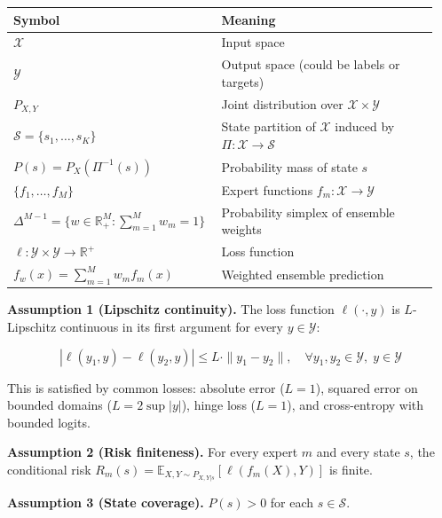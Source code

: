 \documentclass[
  12pt,
]{article}
\begin{document}
\begin{longtable}[]{@{}p{0.45\linewidth}p{0.50\linewidth}@{}}
\toprule\noalign{}
\begin{minipage}[b]{\linewidth}\raggedright
Symbol
\end{minipage} & \begin{minipage}[b]{\linewidth}\raggedright
Meaning
\end{minipage} \\
\midrule\noalign{}
\endhead
\bottomrule\noalign{}
\endlastfoot
\(\mathcal{X}\) & Input space \\
\(\mathcal{Y}\) & Output space (could be labels or targets) \\
\(P_{X,Y}\) & Joint distribution over
\(\mathcal{X} \times \mathcal{Y}\) \\
\(\mathcal{S} = \{s_1,\dots,s_K\}\) & State partition of \(\mathcal{X}\)
induced by \(\Pi: \mathcal{X} \to \mathcal{S}\) \\
\(P(s) = P_X(\Pi^{-1}(s))\) & Probability mass of state \(s\) \\
\(\{f_1,\dots,f_M\}\) & Expert functions
\(f_m: \mathcal{X} \to \mathcal{Y}\) \\
\(\Delta^{M-1} = \{w \in \mathbb{R}^M_+ : \sum_{m=1}^M w_m = 1\}\) &
Probability simplex of ensemble weights \\
\(\ell: \mathcal{Y} \times \mathcal{Y} \to \mathbb{R}^+\) & Loss
function \\
\(f_w(x) = \sum_{m=1}^M w_m f_m(x)\) & Weighted ensemble prediction \\
\end{longtable}

\textbf{Assumption 1 (Lipschitz continuity).} The loss function
\(\ell(\cdot, y)\) is \(L\)-Lipschitz continuous in its first argument
for every \(y \in \mathcal{Y}\):

\[|\ell(y_1, y) - \ell(y_2, y)| \leq L \cdot \|y_1 - y_2\|, \quad \forall y_1, y_2 \in \mathcal{Y}, \; y \in \mathcal{Y}\]

This is satisfied by common losses: absolute error (\(L=1\)), squared
error on bounded domains (\(L = 2\sup|y|\)), hinge loss (\(L=1\)), and
cross-entropy with bounded logits.

\textbf{Assumption 2 (Risk finiteness).} For every expert \(m\) and
every state \(s\), the conditional risk
\(R_m(s) = \mathbb{E}_{X,Y \sim P_{X,Y|s}}[\ell(f_m(X), Y)]\) is finite.

\textbf{Assumption 3 (State coverage).} \(P(s) > 0\) for each
\(s \in \mathcal{S}\).
\end{document}
